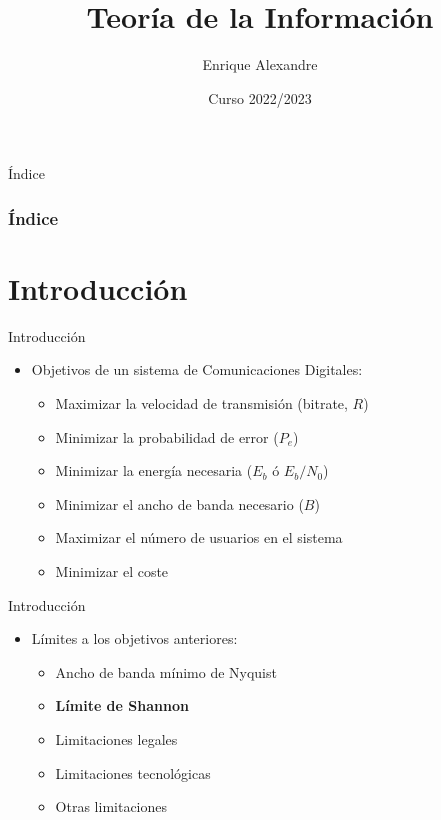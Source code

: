 \documentclass[10pt,compress]{beamer} %
\title[Teoría de la Información]{Teoría de la Información}
\author{Enrique Alexandre}
\institute{Dpto. de Teoría de la Señal y Comunicaciones}
\date{Curso 2022/2023}
\begin{document}
{\titlepageBlue
    \begin{frame}
        \titlepage
    \end{frame}
}

{
\begin{frame}[shrink]{Índice}
 \frametitle{Índice}
 \tableofcontents
\end{frame}
}

\section{Introducción}

\begin{frame}{Introducción}
\begin{itemize}
  \item Objetivos de un sistema de Comunicaciones Digitales:
  \begin{itemize}
    \item Maximizar la velocidad de transmisión (bitrate, $R$)
    \item Minimizar la probabilidad de error ($P_e$)
    \item Minimizar la energía necesaria ($E_b$ ó $E_b/N_0$)
    \item Minimizar el ancho de banda necesario ($B$)
    \item Maximizar el número de usuarios en el sistema
    \item Minimizar el coste
  \end{itemize}
\end{itemize}
\end{frame}

\begin{frame}{Introducción}
  \begin{itemize}
    \item Límites a los objetivos anteriores:
    \begin{itemize}
      \item Ancho de banda mínimo de Nyquist
      \item {\bf Límite de Shannon}
      \item Limitaciones legales
      \item Limitaciones tecnológicas
      \item Otras limitaciones
    \end{itemize}
  \end{itemize}
  \end{frame}
\end{document}
